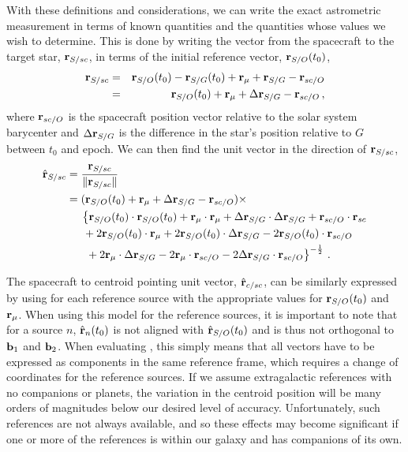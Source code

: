 With these definitions and considerations, we can write the exact astrometric measurement  in terms of known quantities and the quantities whose values we wish to determine.  This is done by writing the vector from the spacecraft to the target star, $\mathbf r_{S/sc}$, in terms of the initial reference vector, $\mathbf{r}_{S/O}(t_0)$,
%
\begin{eqnarray}
\mathbf{r}_{S/sc} & = & \mathbf{r}_{S/O}(t_0) - \mathbf{r}_{S/G}(t_0) + \mathbf{r}_\mu + \mathbf{r}_{S/G} - \mathbf{r}_{sc/O} \nonumber \\
& = & \mathbf{r}_{S/O}(t_0) + \mathbf{r}_\mu + \Delta \mathbf{r}_{S/G} - \mathbf{r}_{sc/O} \,,
\end{eqnarray}
where $\mathbf{r}_{sc/O}$ is the spacecraft position vector relative to the solar system barycenter and  $\Delta \mathbf{r}_{S/G}$ is the difference in the star's position relative to $G$ between $t_0$ and epoch. We can then find the unit vector in the direction of $\mathbf{r}_{S/sc}$,
%
\begin{equation}\label{eq:rhat_ssc}
\begin{split}
\hat{\mathbf{r}}_{S/sc} &= \frac{\mathbf{r}_{S/sc}}{\| \mathbf{r}_{S/sc} \|}  \\
&= (\mathbf{r}_{S/O}(t_0) + \mathbf{r}_\mu +\Delta \mathbf{r}_{S/G}- \mathbf{r}_{sc/O})\times  \\
&\hspace{3ex}  \left\{\mathbf{r}_{S/O}(t_0)\cdot\mathbf{r}_{S/O}(t_0) + \mathbf{r}_\mu \cdot \mathbf{r}_\mu + \Delta \mathbf{r}_{S/G} \cdot \Delta \mathbf{r}_{S/G} +\mathbf{r}_{sc/O} \cdot \mathbf{r}_{sc} \right. \\
&\hspace{3.5ex}{}+ 2\mathbf{r}_{S/O}(t_0) \cdot \mathbf{r}_\mu + 2\mathbf{r}_{S/O}(t_0) \cdot \Delta \mathbf{r}_{S/G} - 2\mathbf{r}_{S/O}(t_0) \cdot \mathbf{r}_{sc/O} \\
&\hspace{3.5ex}\left.{} + 2 \mathbf{r}_\mu \cdot \Delta \mathbf{r}_{S/G} - 2 \mathbf{r}_\mu \cdot \mathbf{r}_{sc/O} - 2 \Delta \mathbf{r}_{S/G} \cdot \mathbf{r}_{sc/O}\right\}^{-\frac{1}{2}} \,. 
 \end{split}
\end{equation}

The spacecraft to centroid pointing unit vector, $\hat{\mathbf r}_{c/sc}$, can be similarly expressed by using  for each reference source with the appropriate values for $\mathbf{r}_{S/O}(t_0)$ and $\mathbf{r}_\mu$.  When using this model for the reference sources, it is important to note that for a source $n$, $\hat{\mathbf{r}}_{n}(t_0)$ is not aligned with $\hat{\mathbf{r}}_{S/O}(t_0)$ and is thus not orthogonal to $\mathbf b_1$ and $\mathbf b_2$.  When evaluating , this simply means that all vectors have to be expressed as components in the same reference frame, which requires a change of coordinates for the reference sources.  If we assume extragalactic references with no companions or planets, the variation in the centroid position will be many orders of magnitudes below our desired level of accuracy.  Unfortunately, such references are not always available, and so these effects may become significant if one or more of the references is within our galaxy and has companions of its own.

